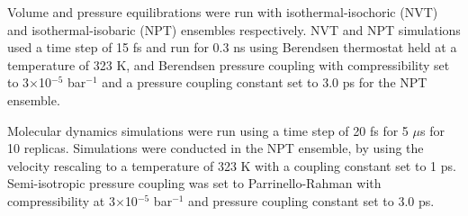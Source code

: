 Volume and pressure equilibrations were run with isothermal-isochoric (NVT) and isothermal-isobaric (NPT) ensembles respectively. NVT and NPT simulations used a time step of 15 fs and run for 0.3 ns using Berendsen thermostat held at a temperature of 323 K, and Berendsen pressure coupling with compressibility set to 3$\times$10$^{-5}$ bar$^{-1}$ and a pressure coupling constant set to 3.0 ps  for the NPT ensemble. 

Molecular dynamics simulations were run using a time step of 20 fs for 5 $\mu$s for 10 replicas. Simulations were conducted in the NPT ensemble, by using the velocity rescaling to a temperature of 323 K with a coupling constant set to 1 ps. Semi-isotropic pressure coupling was set to Parrinello-Rahman with compressibility at 3$\times$10$^{-5}$ bar$^{-1}$ and pressure coupling constant set to 3.0 ps. 

